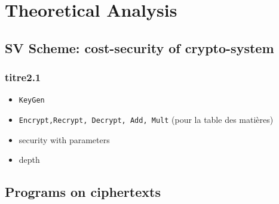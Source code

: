 \documentclass{beamer}
\begin{document}
\section{Theoretical Analysis}

\subsection{SV Scheme: cost-security of crypto-system}

\begin{frame} \frametitle{titre2.1}
  \begin{itemize}
  \item {\tt KeyGen}
    \pause
  \item {\tt Encrypt,Recrypt, Decrypt, Add, Mult} (pour la table des matières)
  \pause
 
  \item security with parameters
  \item depth
  \end{itemize}
\end{frame}

\subsection{Programs on ciphertexts}
\end{document}
